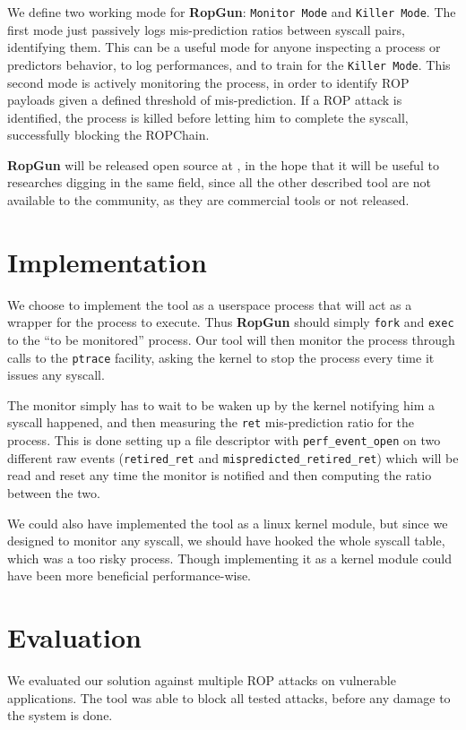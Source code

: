 \documentclass[11pt]{article}
\begin{document}
We define two working mode for {\bf RopGun}: {\tt Monitor Mode} and {\tt Killer Mode}. The first mode just passively logs mis-prediction ratios between syscall pairs, identifying them. This can be a useful mode for anyone inspecting a process or predictors behavior, to log performances, and to train for the {\tt Killer Mode}. This second mode is actively monitoring the process, in order to identify ROP payloads given a defined threshold of mis-prediction. If a ROP attack is identified, the process is killed before letting him to complete the syscall, successfully blocking the ROPChain.

{\bf RopGun} will be released open source at , in the hope that it will be useful to researches digging in the same field, since all the other described tool are not available to the community, as they are commercial tools or not released.

\section{Implementation}
We choose to implement the tool as a userspace process that will act as a wrapper for the process to execute. Thus {\bf RopGun} should simply {\tt fork} and {\tt exec} to the ``to be monitored'' process. Our tool will then monitor the process through calls to the {\tt ptrace} facility, asking the kernel to stop the process every time it issues any syscall.

The monitor simply has to wait to be waken up by the kernel notifying him a syscall happened, and then measuring the {\tt ret} mis-prediction ratio for the process. This is done setting up a file descriptor with {\tt perf\_event\_open} on two different raw events ({\tt retired\_ret} and {\tt mispredicted\_retired\_ret}) which will be read and reset any time the monitor is notified and then computing the ratio between the two.

We could also have implemented the tool as a linux kernel module, but since we designed to monitor any syscall, we should have hooked the whole syscall table, which was a too risky process. Though implementing it as a kernel module could have been more beneficial performance-wise.

\section{Evaluation}
We evaluated our solution against multiple ROP attacks on vulnerable applications. The tool was able to block all tested attacks, before any damage to the system is done.
\end{document}
